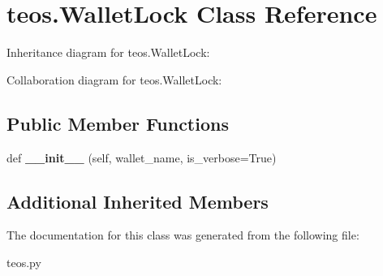 \hypertarget{classteos_1_1WalletLock}{}\section{teos.\+Wallet\+Lock Class Reference}
\label{classteos_1_1WalletLock}


Inheritance diagram for teos.\+Wallet\+Lock\+:


Collaboration diagram for teos.\+Wallet\+Lock\+:
\subsection*{Public Member Functions}
\begin{DoxyCompactItemize}
\item 
\mbox{\label{classteos_1_1WalletLock_a7f22c562f2449d7356f8e69fd6afc1d1}} 
def {\bfseries \+\_\+\+\_\+init\+\_\+\+\_\+} (self, wallet\+\_\+name, is\+\_\+verbose=True)
\end{DoxyCompactItemize}
\subsection*{Additional Inherited Members}


The documentation for this class was generated from the following file\+:\begin{DoxyCompactItemize}
\item 
teos.\+py\end{DoxyCompactItemize}
